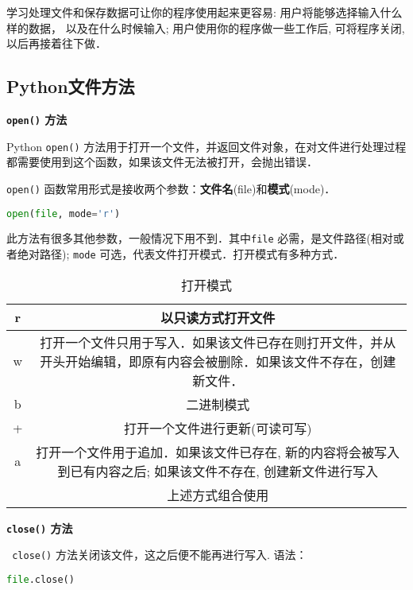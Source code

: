 学习处理文件和保存数据可让你的程序使用起来更容易: 用户将能够选择输入什么样的数据， 以及在什么时候输入; 用户使用你的程序做一些工作后, 可将程序关闭, 以后再接着往下做．
\subsection{Python文件方法}
\textbf{\verb|open()| 方法}

Python \verb|open()| 方法用于打开一个文件，并返回文件对象，在对文件进行处理过程都需要使用到这个函数，如果该文件无法被打开，会抛出错误．


\verb|open()| 函数常用形式是接收两个参数：\textbf{文件名}(file)和\textbf{模式}(mode)．
\begin{lstlisting}[language=python]
open(file, mode='r')
\end{lstlisting}
此方法有很多其他参数，一般情况下用不到．其中\verb|file| 必需，是文件路径(相对或者绝对路径); \verb|mode| 可选，代表文件打开模式．打开模式有多种方式．
\begin{table}[ht]
\centering
\caption{打开模式}\label{PyFile_tab1}
\begin{tabular}{|c|c|}
\hline
r & 以只读方式打开文件 \\
\hline
w & 打开一个文件只用于写入．如果该文件已存在则打开文件，并从开头开始编辑，即原有内容会被删除．如果该文件不存在，创建新文件． \\
\hline
b & 二进制模式 \\
\hline
+ & 打开一个文件进行更新(可读可写) \\
\hline
a & 打开一个文件用于追加．如果该文件已存在, 新的内容将会被写入到已有内容之后; 如果该文件不存在, 创建新文件进行写入 \\
\hline
&上述方式组合使用   \\
\hline
\end{tabular}
\end{table}

\textbf{\verb |close()| 方法}

\verb| close()| 方法关闭该文件，这之后便不能再进行写入. 语法：
\begin{lstlisting}[language=python]
file.close()
\end{lstlisting}

